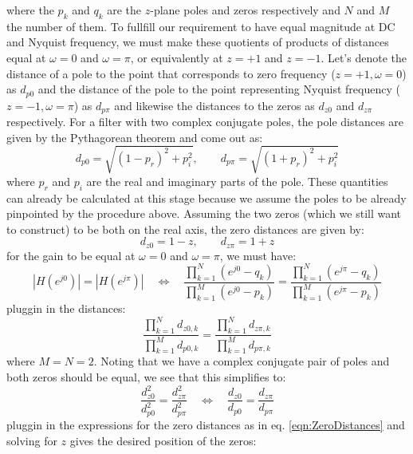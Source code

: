 where the $p_k$ and $q_k$ are the $z$-plane poles and zeros respectively and $N$ and $M$ the number of them. To fullfill our requirement to have equal magnitude at DC and Nyquist frequency, we must make these quotients of products of distances equal at $\omega = 0$ and $\omega = \pi$, or equivalently at $z=+1$ and $z=-1$. Let's denote the distance of a pole to the point that corresponds to zero frequency ($z=+1, \omega=0$) as $d_{p0}$ and the distance of the pole to the point representing Nyquist frequency ($z=-1, \omega=\pi$) as $d_{p \pi}$ and likewise the distances to the zeros as $d_{z0}$ and $d_{z \pi}$ respectively. For a filter with two complex conjugate poles, the pole distances are given by the Pythagorean theorem and come out as:
\begin{equation}
 d_{p0} = \sqrt{(1-p_r)^2 + p_i^2}, \qquad d_{p \pi} = \sqrt{(1+p_r)^2 + p_i^2}
\end{equation}
where $p_r$ and $p_i$ are the real and imaginary parts of the pole. These quantities can already be calculated at this stage because we assume the poles to be already pinpointed by the procedure above. Assuming the two zeros (which we still want to construct) to be both on the real axis, the zero distances are given by:
\begin{equation}
 \label{eqn:ZeroDistances}
 d_{z0} = 1-z, \qquad d_{z \pi} = 1+z
\end{equation}
for the gain to be equal at $\omega = 0$ and $\omega = \pi$, we must have:
\begin{equation}
 |H(e^{j 0})| = |H(e^{j \pi})| \quad \Leftrightarrow \quad
 \frac{\prod_{k=1}^{N} (e^{j 0} - q_k) }  {\prod_{k=1}^{M} (e^{j 0} - p_k)     } =
 \frac{\prod_{k=1}^{N} (e^{j \pi} - q_k) }{\prod_{k=1}^{M} (e^{j \pi} - p_k)   }
\end{equation}
pluggin in the distances:
\begin{equation}
 \frac{\prod_{k=1}^{N} d_{z0,k} }   {\prod_{k=1}^{M} d_{p0,k}      } =
 \frac{\prod_{k=1}^{N} d_{z \pi,k} }{\prod_{k=1}^{M} d_{p \pi,k}   }
\end{equation}
where $M=N=2$. Noting that we have a complex conjugate pair of poles and both zeros should be equal, we see that this simplifies to:
\begin{equation}
 \frac{ d_{z0}^2 } { d_{p0}^2 } = \frac{ d_{z \pi}^2 }{ d_{p \pi}^2 } \quad \Leftrightarrow \quad
 \frac{ d_{z0}   } { d_{p0}   } = \frac{ d_{z \pi}   }{ d_{p \pi}   }
\end{equation}
pluggin in the expressions for the zero distances as in eq. \ref{eqn:ZeroDistances} and solving for $z$ gives the desired position of the zeros:
